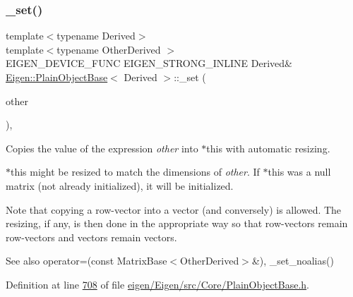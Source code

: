 \subsubsection{\texorpdfstring{\+\_\+set()}{\_set()}\hspace{0.1cm}{\footnotesize\ttfamily [1/2]}}
{\footnotesize\ttfamily template$<$typename Derived$>$ \\
template$<$typename Other\+Derived $>$ \\
E\+I\+G\+E\+N\+\_\+\+D\+E\+V\+I\+C\+E\+\_\+\+F\+U\+NC E\+I\+G\+E\+N\+\_\+\+S\+T\+R\+O\+N\+G\+\_\+\+I\+N\+L\+I\+NE Derived\& \hyperlink{class_eigen_1_1_plain_object_base}{Eigen\+::\+Plain\+Object\+Base}$<$ Derived $>$\+::\+\_\+set (\begin{DoxyParamCaption}\item[{const \hyperlink{group___core___module_class_eigen_1_1_dense_base}{Dense\+Base}$<$ Other\+Derived $>$ \&}]{other }\end{DoxyParamCaption})\hspace{0.3cm}{\ttfamily [inline]}, {\ttfamily [protected]}}



Copies the value of the expression {\itshape other} into {\ttfamily $\ast$this} with automatic resizing. 

$\ast$this might be resized to match the dimensions of {\itshape other}. If $\ast$this was a null matrix (not already initialized), it will be initialized.

Note that copying a row-\/vector into a vector (and conversely) is allowed. The resizing, if any, is then done in the appropriate way so that row-\/vectors remain row-\/vectors and vectors remain vectors.

\begin{DoxySeeAlso}{See also}
operator=(const Matrix\+Base$<$\+Other\+Derived$>$\&), \+\_\+set\+\_\+noalias() 
\end{DoxySeeAlso}


Definition at line \hyperlink{eigen_2_eigen_2src_2_core_2_plain_object_base_8h_source_l00708}{708} of file \hyperlink{eigen_2_eigen_2src_2_core_2_plain_object_base_8h_source}{eigen/\+Eigen/src/\+Core/\+Plain\+Object\+Base.\+h}.

\mbox{\label{class_eigen_1_1_plain_object_base_aa77dab5e9e6ba9e39740e17cfae78a33}} 
